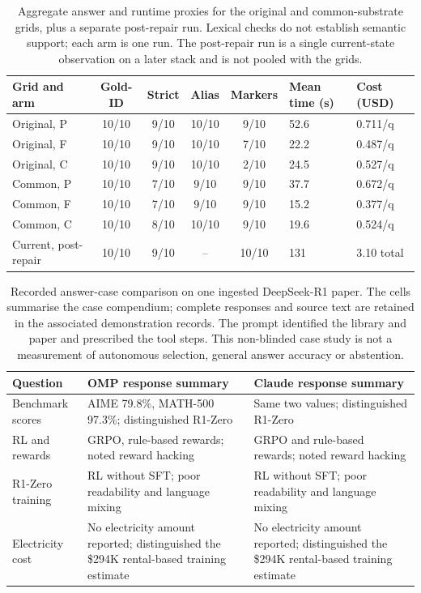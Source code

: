 \documentclass[11pt]{article}
\begin{document}
\begin{table}
\centering
\small
\setlength{\tabcolsep}{4pt}
\caption{Aggregate answer and runtime proxies for the original and
common-substrate grids, plus a separate post-repair run. Lexical checks do
not establish semantic support; each arm is one run. The post-repair run is
a single current-state observation on a later stack and is not pooled with
the grids.}

\begin{tabular}{@{}p{4cm}*{4}{c}p{4cm}p{4cm}@{}}
\toprule
Grid and arm & Gold-ID & Strict & Alias & Markers & Mean time (s) & Cost (USD)\\
\midrule
Original, P & 10/10 & 9/10 & 10/10 & 9/10 & 52.6 & 0.711/q\\
Original, F & 10/10 & 9/10 & 10/10 & 7/10 & 22.2 & 0.487/q\\
Original, C & 10/10 & 9/10 & 10/10 & 2/10 & 24.5 & 0.527/q\\
Common, P & 10/10 & 7/10 & 9/10 & 9/10 & 37.7 & 0.672/q\\
Common, F & 10/10 & 7/10 & 9/10 & 9/10 & 15.2 & 0.377/q\\
Common, C & 10/10 & 8/10 & 10/10 & 9/10 & 19.6 & 0.524/q\\
Current, post-repair & 10/10 & 9/10 & -- & 10/10 & 131 & 3.10 total\\
\bottomrule
\end{tabular}
\end{table}
\begin{table}
\centering\small
\caption{Recorded answer-case comparison on one ingested DeepSeek-R1 paper.
The cells summarise the case compendium; complete responses and source text
are retained in the associated demonstration records. The prompt identified
the library and paper and prescribed the tool steps. This non-blinded case
study is not a measurement of autonomous selection, general answer accuracy or
abstention.}

\begin{tabular}{@{}p{4cm}p{4cm}p{4cm}@{}}
\toprule
Question & OMP response summary & Claude response summary \\
\midrule
Benchmark scores & AIME 79.8\%, MATH-500 97.3\%; distinguished R1-Zero & Same two values; distinguished R1-Zero \\
RL and rewards & GRPO, rule-based rewards; noted reward hacking & GRPO and rule-based rewards; noted reward hacking \\
R1-Zero training & RL without SFT; poor readability and language mixing & RL without SFT; poor readability and language mixing \\
Electricity cost & No electricity amount reported; distinguished the \$294K rental-based training estimate & No electricity amount reported; distinguished the \$294K rental-based training estimate \\
\bottomrule
\end{tabular}
\end{table}
\end{document}
